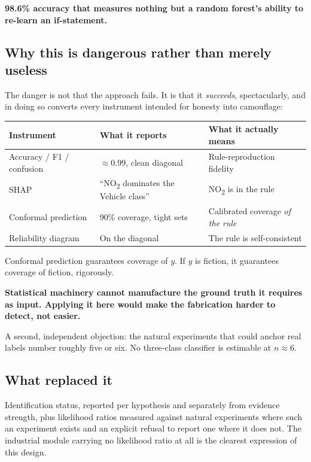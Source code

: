 \documentclass[11pt,a4paper]{article}
\newcommand{\keyclaim}[1]{%
  \par\vspace{0.7ex}\noindent
  \colorbox{vwash}{\parbox{\dimexpr\linewidth-2\fboxsep}{%
    \color{vblack}\textbf{#1}}}%
  \par\vspace{0.9ex}}
\newcommand{\NOx}{NO\textsubscript{2}}
\begin{document}
\keyclaim{98.6\% accuracy that measures nothing but a random forest's ability to
re-learn an if-statement.}

\subsection{Why this is dangerous rather than merely useless}

The danger is not that the approach fails. It is that it \emph{succeeds},
spectacularly, and in doing so converts every instrument intended for honesty into
camouflage:

\begin{center}
\small
\begin{tabularx}{\linewidth}{@{}l l X@{}}
\toprule
\textbf{Instrument} & \textbf{What it reports} & \textbf{What it actually means} \\
\midrule
Accuracy / F1 / confusion & $\approx 0.99$, clean diagonal & Rule-reproduction fidelity \\
SHAP & ``\NOx{} dominates the Vehicle class'' & \NOx{} is in the rule \\
Conformal prediction & 90\% coverage, tight sets & Calibrated coverage \emph{of the rule} \\
Reliability diagram & On the diagonal & The rule is self-consistent \\
\bottomrule
\end{tabularx}
\end{center}

Conformal prediction guarantees coverage of $y$. If $y$ is fiction, it guarantees
coverage of fiction, rigorously.

\keyclaim{Statistical machinery cannot manufacture the ground truth it requires as
input. Applying it here would make the fabrication harder to detect, not easier.}

A second, independent objection: the natural experiments that could anchor real
labels number roughly five or six. No three-class classifier is estimable at
$n \approx 6$.

\subsection{What replaced it}

Identification status, reported per hypothesis and separately from evidence
strength, plus likelihood ratios measured against natural experiments where such an
experiment exists and an explicit refusal to report one where it does not. The
industrial module carrying no likelihood ratio at all is the clearest expression of
this design.
\end{document}

